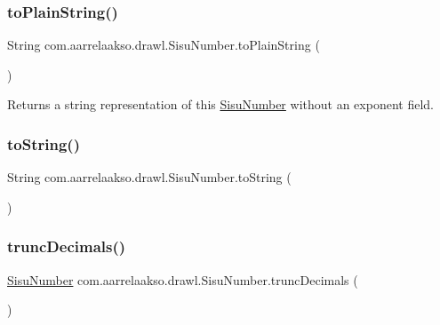 \subsubsection{\texorpdfstring{to\+Plain\+String()}{toPlainString()}}
{\footnotesize\ttfamily String com.\+aarrelaakso.\+drawl.\+Sisu\+Number.\+to\+Plain\+String (\begin{DoxyParamCaption}{ }\end{DoxyParamCaption})\hspace{0.3cm}{\ttfamily [protected]}}

\begin{DoxyReturn}{Returns}
a string representation of this \hyperlink{classcom_1_1aarrelaakso_1_1drawl_1_1_sisu_number}{Sisu\+Number} without an exponent field. 
\end{DoxyReturn}
\mbox{\label{classcom_1_1aarrelaakso_1_1drawl_1_1_sisu_number_a0ed133b435cf93b55afbecb6d28e6cd6}} 
\subsubsection{\texorpdfstring{to\+String()}{toString()}}
{\footnotesize\ttfamily String com.\+aarrelaakso.\+drawl.\+Sisu\+Number.\+to\+String (\begin{DoxyParamCaption}{ }\end{DoxyParamCaption})}

\mbox{\label{classcom_1_1aarrelaakso_1_1drawl_1_1_sisu_number_ad237bd3a51bc78b3e8cf78d53c1d09c9}} 
\subsubsection{\texorpdfstring{trunc\+Decimals()}{truncDecimals()}}
{\footnotesize\ttfamily \hyperlink{classcom_1_1aarrelaakso_1_1drawl_1_1_sisu_number}{Sisu\+Number} com.\+aarrelaakso.\+drawl.\+Sisu\+Number.\+trunc\+Decimals (\begin{DoxyParamCaption}{ }\end{DoxyParamCaption})\hspace{0.3cm}{\ttfamily [protected]}}



